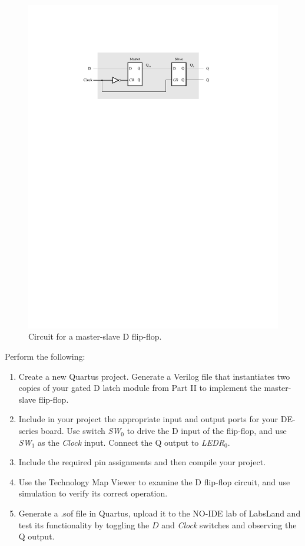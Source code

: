 \documentclass[epsfig,10pt,fullpage]{article}
\begin{document}
\begin{figure}[H]
	\begin{center}
		\includegraphics[]{figures/figure5.pdf}
	\end{center}
	\caption{Circuit for a master-slave D flip-flop.}
\label{fig:MS_FF}
\end{figure}

Perform the following:
\begin{enumerate}
\item Create a new Quartus project. Generate a Verilog file that instantiates two
copies of your gated D latch module from Part II to implement the master-slave flip-flop.
\item Include in your project the appropriate input and output ports for your
DE-series board. Use switch {\it SW}$_0$ to drive the D input of the flip-flop,
and use {\it SW}$_1$ as the {\it Clock} input. Connect the Q output to {\it LEDR}$_{0}$.
\item
Include the required pin assignments and then compile your project.
\item Use the Technology Map Viewer to examine the D flip-flop circuit, and use simulation to
verify its correct operation.
\item
Generate a .sof file in Quartus, upload it to the NO-IDE lab of LabsLand and test its functionality 
by toggling the $D$ and {\it Clock} switches and observing the Q output.
\end{enumerate}
\end{document}
